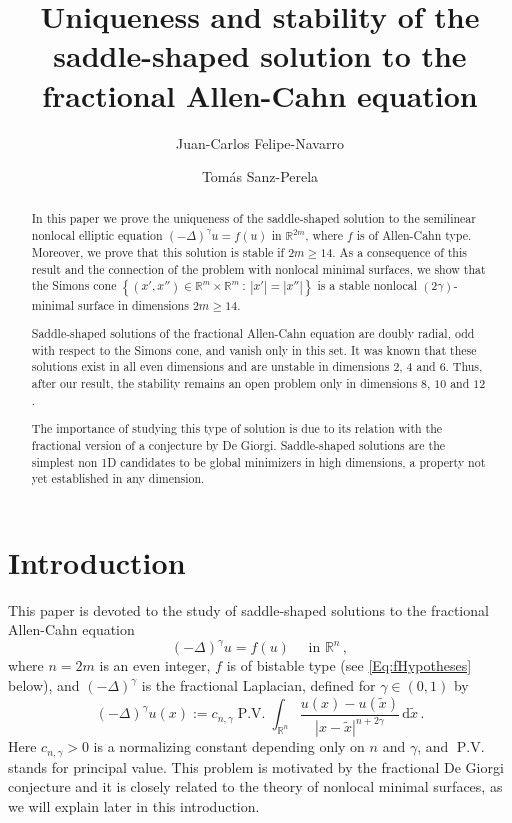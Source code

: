 \documentclass[12pt,reqno]{amsart}
\title[Saddle solution to the fractional Allen-Cahn equation]{Uniqueness and stability of the saddle-shaped solution to the fractional Allen-Cahn equation}
\author{Juan-Carlos Felipe-Navarro}
\author{Tomás Sanz-Perela}
\theoremstyle{definition}
\theoremstyle{remark}
\newcommand{\con}[1]{\mathbb{#1}}
\newcommand{\R}{\con{R}} %
\newcommand{\s}{\gamma}
\newcommand{\fraclaplacian}{(-\Delta)^\s}
\renewcommand{\d}{\,\mathrm{d}} %
\newcommand{\setcond}[2]{\left \{ #1 \ : \ #2  \right \}}
\DeclareMathOperator{\PV}{P.V.}
\numberwithin{equation}{section}
\begin{document}
\begin{abstract}
In this paper we prove the uniqueness of the saddle-shaped solution to the semilinear nonlocal elliptic equation $\fraclaplacian u = f(u)$ in $\R^{2m}$, where $f$ is of Allen-Cahn type. Moreover, we prove that this solution is stable if $2m\geq 14$. As a consequence of this result and the connection of the problem with nonlocal minimal surfaces, we show that the Simons cone $\setcond{(x', x'') \in \R^{m}\times \R^m}{|x'| = |x''|}$ is a stable nonlocal $(2\s)$-minimal surface in dimensions $2m\geq 14$.

Saddle-shaped solutions of the fractional Allen-Cahn equation are doubly radial, odd with respect to the Simons cone, and vanish only in this set. It was known that these solutions exist in all even dimensions and are unstable in dimensions $2$, $4$ and $6$. Thus, after our result, the stability remains an open problem only in dimensions $8$, $10$ and $12$.

The importance of studying this type of solution is due to its relation with the fractional version of a conjecture by De Giorgi. Saddle-shaped solutions are the simplest non 1D candidates to be global minimizers in high dimensions, a property not yet established in any dimension.
\end{abstract}


\maketitle




\section{Introduction}

This paper is devoted to the study of saddle-shaped solutions to the fractional Allen-Cahn equation
\begin{equation}
\label{Eq:AllenCahn}
\fraclaplacian u = f(u)  \quad \text{ in } \R^{n}\,,
\end{equation}
where $n=2m$ is an even integer, $f$ is of bistable type (see \eqref{Eq:fHypotheses} below), and $\fraclaplacian$ is the fractional Laplacian, defined for $\s\in(0,1)$ by
$$
\fraclaplacian u (x):= c_{n,\s}  \PV \int_{\R^{n}} \dfrac{u(x) - u(\tilde{x})}{|x-\tilde{x}|^{n+2\s}} \d \tilde{x}\,.
$$
Here $c_{n,\s}>0$ is a normalizing constant depending only on $n$ and $\s$, and $\PV$ stands for principal value. This problem is motivated by the fractional De Giorgi conjecture and it is closely related to the theory of nonlocal minimal surfaces, as we will explain later in this introduction.
\end{document}
